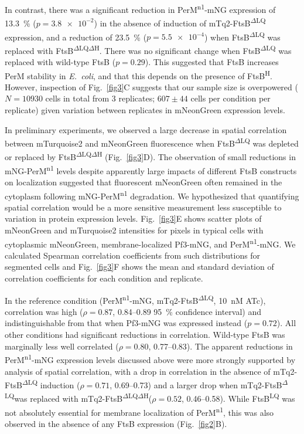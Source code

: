 \documentclass[pdflatex,sn-basic]{sn-jnl}%
\newcommand\ec{\textit{E.~coli}}
\newcommand\ftsbLQ{FtsB\textsuperscript{LQ}}
\newcommand\ftsbH{FtsB\textsuperscript{H}}
\newcommand\ftsbdLQ{FtsB\textsuperscript{$\Delta{}$LQ}}
\newcommand\ftsbdLQdH{FtsB\textsuperscript{$\Delta{}$LQ$\Delta{}$H}}
\newcommand\permN{PerM\textsuperscript{n1}}
\begin{document}
In contrast, there was a significant reduction in \permN{}-mNG expression of \qty{13.3}{\percent} ($p=\num{3.8e-2}$) in the absence of induction of mTq2-\ftsbdLQ{} expression, and a reduction of \qty{23.5}{\percent} ($p=\num{5.5e-4}$) when \ftsbdLQ{} was replaced with \ftsbdLQdH{}. There was no significant change when \ftsbdLQ{} was replaced with wild-type FtsB ($p=0.29$). This suggested that FtsB increases PerM stability in \ec{}, and that this depends on the presence of \ftsbH{}. However, inspection of Fig.~\ref{fig3}C suggests that our sample size is overpowered ($N=\num{10930}$ cells in total from 3 replicates; $607 \pm 44$ cells per condition per replicate) given variation between replicates in mNeonGreen expression levels. 

In preliminary experiments, we observed a large decrease in spatial correlation between mTurquoise2 and mNeonGreen fluorescence when \ftsbdLQ{} was depleted or replaced by \ftsbdLQdH{} (Fig.~\ref{fig3}D). The observation of small reductions in mNG-\permN{} levels despite apparently large impacts of different FtsB constructs on localization suggested that fluorescent mNeonGreen often remained in the cytoplasm following mNG-\permN{} degradation. We hypothesized that quantifying spatial correlation would be a more sensitive measurement less susceptible to variation in protein expression levels. Fig.~\ref{fig3}E shows scatter plots of mNeonGreen and mTurquoise2 intensities for pixels in typical cells with cytoplasmic mNeonGreen, membrane-localized Pf3-mNG, and \permN{}-mNG. We calculated Spearman correlation coefficients from such distributions for segmented cells and Fig.~\ref{fig3}F shows the mean and standard deviation of correlation coefficients for each condition and replicate.

In the reference condition (\permN{}-mNG, mTq2-\ftsbdLQ, \qty{10}{nM} ATc), correlation was high ($\rho = 0.87$, 0.84--0.89 \qty{95}{\percent} confidence interval) and indistinguishable from that when Pf3-mNG was expressed instead ($p = 0.72$). All other conditions had significant reductions in correlation. Wild-type FtsB was marginally less well correlated ($\rho = 0.80$, 0.77--0.83). The apparent reductions in \permN{}-mNG expression levels discussed above were more strongly supported by analysis of spatial correlation, with a drop in correlation in the absence of mTq2-\ftsbdLQ{} induction ($\rho = 0.71$, 0.69--0.73) and a larger drop when mTq2-\ftsbdLQ was replaced with mTq2-\ftsbdLQdH ($\rho = 0.52$, 0.46--0.58). While \ftsbLQ{} was not absolutely essential for membrane localization of \permN{}, this was also observed in the absence of any FtsB expression (Fig.~\ref{fig2}B).
\end{document}
